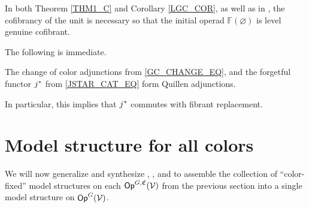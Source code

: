 \documentclass[a4paper,10pt
,draft
]{article}%
\renewcommand{\1}{\eta}%
\begin{document}
\begin{remark}
      In both Theorem \ref{THM1_C} and Corollary \ref{LGC_COR}, as well as in \cite{BP_geo},
      the cofibrancy of the unit is necessary so that the initial operad $\mathbb F(\varnothing)$ is level genuine cofibrant.
\end{remark}



The following is immediate.
\begin{corollary}
      \label{COLOR_CHANGE_Q_COR}
      The change of color adjunctions from \eqref{GC_CHANGE_EQ},
      and the forgetful functor $j^{\**}$ from \eqref{JSTAR_CAT_EQ}
      form Quillen adjunctions.
\end{corollary}

\begin{remark}
      In particular, this implies that $j^{\**}$ commutes with fibrant replacement.
\end{remark}








\newpage

\section{Model structure for all colors}
\label{MS_SEC}
\renewcommand{\C}{\mathfrak C}

We will now generalize and synthesize \cite{BM13}, \cite{Cav}, and \cite{CM13b} to assemble the collection of
``color-fixed'' model structures on each $\mathsf{Op}^{G, \mathfrak C}(\mathcal V)$ from the previous section
into a single model structure on $\mathsf{Op}^G(\mathcal V)$.



\end{document}
